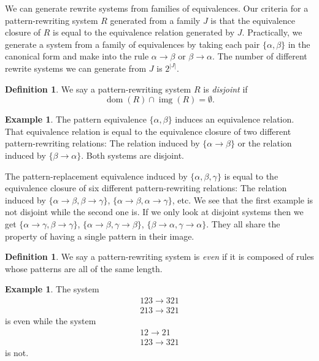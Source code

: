\documentclass[a4paper, 11pt, english]{article}
\newcommand{\patternrule}{ \to \!}
\theoremstyle{definition}
\newtheorem{definition}[theorem]{Definition}
\newtheorem{example}[theorem]{Example}
\DeclareMathOperator{\dom}{dom}
\DeclareMathOperator{\img}{img}
\begin{document}
We can generate rewrite systems from families of equivalences. Our criteria for a pattern-rewriting
system $R$ generated from a family $J$ is that the equivalence closure of $R$ is equal to the
equivalence relation generated by $J$. 
Practically, we generate a system from a family of equivalences by taking each pair $\{\alpha, \beta
\}$ in the canonical form and make into the rule $\alpha \patternrule \beta$ or $\beta \patternrule
\alpha$. The number of different rewrite systems we can generate from $J$ is $2^{|J|}$.

\begin{definition}
  We say a pattern-rewriting system $R$ is \emph{disjoint} if 
  \[
    \dom(R) \cap \img(R) = \emptyset.
  \]
\end{definition}

\begin{example}
  The pattern equivalence $\{ \alpha, \beta \}$ induces an equivalence relation.
  That equivalence relation is equal to the equivalence closure of two different pattern-rewriting
  relations: The relation induced by $\{ \alpha \patternrule \beta \}$ or the relation induced by
  $\{ \beta \patternrule \alpha \}$. Both systems are disjoint.

  The pattern-replacement equivalence induced by $\{ \alpha, \beta, \gamma \}$ is
  equal to the equivalence closure of six different pattern-rewriting
  relations: The relation induced by $\{ \alpha \patternrule \beta, \beta \patternrule \gamma \}$,
  $\{ \alpha \patternrule \beta, \alpha \patternrule \gamma \}$, etc. We see that the first example is
  not disjoint while the second one is. If we only look at disjoint systems then we get
  $\{ \alpha \patternrule \gamma, \beta \patternrule \gamma \}$,
  $\{ \alpha \patternrule \beta, \gamma \patternrule \beta \}$,
  $\{ \beta \patternrule \alpha, \gamma \patternrule \alpha \}$.
  They all share the property of having a single pattern in their image.
\end{example}

\begin{definition}
  We say a pattern-rewriting system is \emph{even} if it is composed of rules whose patterns are all
  of the same length.
\end{definition}

\begin{example}
  The system
  \begin{gather*}
    123 \patternrule 321 \\
    213 \patternrule 321
  \end{gather*}
  is even while the system
  \begin{gather*}
    12 \patternrule 21 \\
    123 \patternrule 321 
  \end{gather*}
  is not.
\end{example}
\end{document}
